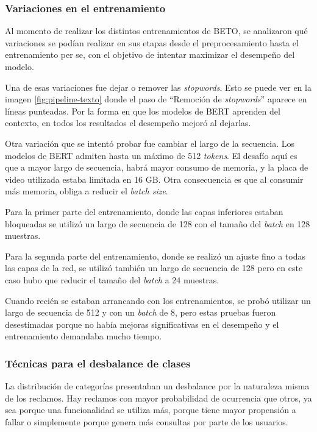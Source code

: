 \subsubsection{Variaciones en el entrenamiento}

Al momento de realizar los distintos entrenamientos de BETO, se analizaron qué variaciones se podían realizar en sus etapas desde el preprocesamiento hasta el entrenamiento per se, con el objetivo de intentar maximizar el desempeño del modelo. 

Una de esas variaciones fue dejar o remover las \textit{stopwords}. Esto se puede ver en la imagen \ref{fig:pipeline-texto} donde el paso de ``Remoción de \textit{stopwords}'' aparece en líneas punteadas. Por la forma en que los modelos de BERT aprenden del contexto, en todos los resultados el desempeño mejoró al dejarlas.

Otra variación que se intentó probar fue cambiar el largo de la secuencia. Los modelos de BERT admiten hasta un máximo de 512 \textit{tokens}. El desafío aquí es que a mayor largo de secuencia, habrá mayor consumo de memoria, y la placa de video utilizada estaba limitada en 16 GB. Otra consecuencia es que al consumir más memoria, obliga a reducir el \textit{batch size}.

Para la primer parte del entrenamiento, donde las capas inferiores estaban bloqueadas se utilizó un largo de secuencia de 128 con el tamaño del \textit{batch} en 128 muestras.

Para la segunda parte del entrenamiento, donde se realizó un ajuste fino a todas las capas de la red, se utilizó también un largo de secuencia de 128 pero en este caso hubo que reducir el tamaño del \textit{batch} a 24 muestras.

Cuando recién se estaban arrancando con los entrenamientos, se probó utilizar un largo de secuencia de 512 y con un \textit{batch} de 8, pero estas pruebas fueron desestimadas porque no había mejoras significativas en el desempeño y el entrenamiento demandaba mucho tiempo.

\subsubsection{Técnicas para el desbalance de clases}

La distribución de categorías presentaban un desbalance por la naturaleza misma de los reclamos. Hay reclamos con mayor probabilidad de ocurrencia que otros, ya sea porque una funcionalidad se utiliza más, porque tiene mayor propensión a fallar o simplemente porque genera más consultas por parte de los usuarios.

